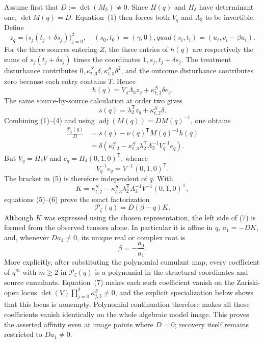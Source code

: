 Assume first that \(D:=\det(M_3)\ne0\).  Since \(H(q)\) and \(H_\delta\) have determinant one, \(\det M(q)=D\).  Equation~(1) then forces both \(V_q\) and \(\Lambda_3\) to be invertible.  Define
\[
 z_q=\bigl(s_j(t_j+\delta s_j)\bigr)_{j=0}^2,
 \quad (s_0,t_0)=(\gamma,0),quad
 (s_i,t_i)=(u_i,v_i-\beta u_i).
\]
For the three sources entering \(Z\), the three entries of \(h(q)\) are respectively the sums of \(s_j(t_j+\delta s_j)\) times the coordinates \(1,s_j,t_j+\delta s_j\).  The treatment disturbance contributes \(0,\kappa^S_{t,3}\delta,\kappa^S_{t,3}\delta^2\), and the outcome disturbance contributes zero because each entry contains \(T\).  Hence
\[
 h(q)=V_q\Lambda_3z_q+\kappa^S_{t,3}\delta e_q. \tag{3}
\]
The same source-by-source calculation at order two gives
\[
 s(q)=\lambda_2^{\mathsf T}z_q+\kappa^S_{t,2}\delta. \tag{4}
\]
Combining (1)--(4) and using \(\operatorname{adj}(M(q))=D M(q)^{-1}\), one obtains
\[
 \begin{aligned}
 \frac{\mathcal P_\zeta(q)}{D}
 &=s(q)-\nu(q)^{\mathsf T}M(q)^{-1}h(q)\\
 &=\delta\left(\kappa^S_{t,2}-\kappa^S_{t,3}
 \lambda_2^{\mathsf T}\Lambda_3^{-1}V_q^{-1}e_q\right).
 \end{aligned} \tag{5}
\]
But \(V_q=H_\delta V\) and \(e_q=H_\delta(0,1,0)^{\mathsf T}\), whence
\[
 V_q^{-1}e_q=V^{-1}(0,1,0)^{\mathsf T}. \tag{6}
\]
The bracket in (5) is therefore independent of \(q\).  With
\[
 K=\kappa^S_{t,2}-\kappa^S_{t,3}\lambda_2^{\mathsf T}
 \Lambda_3^{-1}V^{-1}(0,1,0)^{\mathsf T},
\]
equations (5)--(6) prove the exact factorization
\[
 \mathcal P_\zeta(q)=D(\beta-q)K. \tag{7}
\]
Although \(K\) was expressed using the chosen representation, the left side of (7) is formed from the observed tensors alone.  In particular it is affine in \(q\), \(a_1=-DK\), and, whenever \(Da_1\ne0\), its unique real or complex root is
\[
 \beta=-\frac{a_0}{a_1}. \tag{8}
\]
More explicitly, after substituting the polynomial cumulant map, every coefficient of \(q^m\) with \(m\ge2\) in \(\mathcal P_\zeta(q)\) is a polynomial in the structural coordinates and source cumulants.  Equation~(7) makes each such coefficient vanish on the Zariski-open locus \(\det(V)\prod_{j=0}^2\kappa^S_{j,3}\ne0\), and the explicit specialization below shows that this locus is nonempty.  Polynomial continuation therefore makes all those coefficients vanish identically on the whole algebraic model image.  This proves the asserted affinity even at image points where \(D=0\); recovery itself remains restricted to \(Da_1\ne0\).

